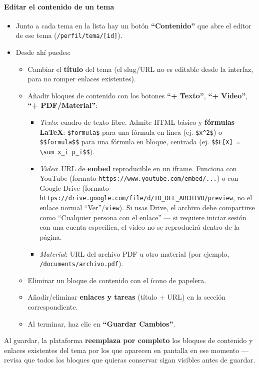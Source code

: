 \documentclass[11pt,a4paper]{article}
\newcommand{\code}[1]{\texttt{#1}}
\begin{document}
\paragraph{Editar el contenido de un tema}
\begin{itemize}
  \item Junto a cada tema en la lista hay un botón \textbf{``Contenido''} que abre el editor de ese tema (\code{/perfil/tema/[id]}).
  \item Desde ahí puedes:
  \begin{itemize}
    \item Cambiar el \textbf{título} del tema (el slug/URL no es editable desde la interfaz, para no romper enlaces existentes).
    \item Añadir bloques de contenido con los botones \textbf{``+ Texto''}, \textbf{``+ Video''}, \textbf{``+ PDF/Material''}:
    \begin{itemize}
      \item \emph{Texto}: cuadro de texto libre. Admite HTML básico y \textbf{fórmulas LaTeX}: \code{\$formula\$} para una fórmula en línea (ej. \code{\$x^2\$}) o \code{\$\$formula\$\$} para una fórmula en bloque, centrada (ej. \code{\$\$E[X] = \textbackslash sum x\_i p\_i\$\$}).
      \item \emph{Video}: URL de \textbf{embed} reproducible en un iframe. Funciona con YouTube (formato \code{https://www.youtube.com/embed/...}) o con Google Drive (formato \code{https://drive.google.com/file/d/ID\_DEL\_ARCHIVO/preview}, no el enlace normal ``Ver''/\code{view}). Si usas Drive, el archivo debe compartirse como ``Cualquier persona con el enlace'' --- si requiere iniciar sesión con una cuenta específica, el video no se reproducirá dentro de la página.
      \item \emph{Material}: URL del archivo PDF u otro material (por ejemplo, \code{/documents/archivo.pdf}).
    \end{itemize}
    \item Eliminar un bloque de contenido con el ícono de papelera.
    \item Añadir/eliminar \textbf{enlaces y tareas} (título + URL) en la sección correspondiente.
    \item Al terminar, haz clic en \textbf{``Guardar Cambios''}.
  \end{itemize}
\end{itemize}

\begin{nota}
Al guardar, la plataforma \textbf{reemplaza por completo} los bloques de contenido y enlaces existentes del tema por los que aparecen en pantalla en ese momento --- revisa que todos los bloques que quieras conservar sigan visibles antes de guardar.
\end{nota}
\end{document}

